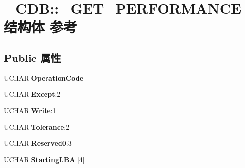 \hypertarget{struct___c_d_b_1_1___g_e_t___p_e_r_f_o_r_m_a_n_c_e}{}\section{\+\_\+\+C\+DB\+:\+:\+\_\+\+G\+E\+T\+\_\+\+P\+E\+R\+F\+O\+R\+M\+A\+N\+C\+E结构体 参考}
\label{struct___c_d_b_1_1___g_e_t___p_e_r_f_o_r_m_a_n_c_e}
\subsection*{Public 属性}
\begin{DoxyCompactItemize}
\item 
\mbox{\label{struct___c_d_b_1_1___g_e_t___p_e_r_f_o_r_m_a_n_c_e_a7a263ded93d3602b24ffd2c0a09519e2}} 
U\+C\+H\+AR {\bfseries Operation\+Code}
\item 
\mbox{\label{struct___c_d_b_1_1___g_e_t___p_e_r_f_o_r_m_a_n_c_e_ae963ab19e0a8c5c607aa383e147eb694}} 
U\+C\+H\+AR {\bfseries Except}\+:2
\item 
\mbox{\label{struct___c_d_b_1_1___g_e_t___p_e_r_f_o_r_m_a_n_c_e_aa70ae27d925d7d61b47b1c88c993cee4}} 
U\+C\+H\+AR {\bfseries Write}\+:1
\item 
\mbox{\label{struct___c_d_b_1_1___g_e_t___p_e_r_f_o_r_m_a_n_c_e_affe40c2d99bc2bf2520e6721c66eec49}} 
U\+C\+H\+AR {\bfseries Tolerance}\+:2
\item 
\mbox{\label{struct___c_d_b_1_1___g_e_t___p_e_r_f_o_r_m_a_n_c_e_aa6d93246c028e4a8ee273dab8796a03d}} 
U\+C\+H\+AR {\bfseries Reserved0}\+:3
\item 
\mbox{\label{struct___c_d_b_1_1___g_e_t___p_e_r_f_o_r_m_a_n_c_e_a363040d8450e7f519ca9f8550b124646}} 
U\+C\+H\+AR {\bfseries Starting\+L\+BA} \mbox{[}4\mbox{]}
\item 
\mbox{\label{struct___c_d_b_1_1___g_e_t___p_e_r_f_o_r_m_a_n_c_e_ab01131d6b39d18dd49cf2ed66c3d2cc1}} 

\end{DoxyCompactItemize}
